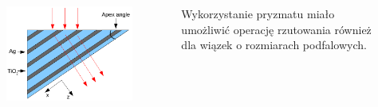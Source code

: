 \documentclass{beamer}
\begin{document}
\begin{frame}
\begin{columns}
\begin{column}{0.5\textwidth}
\begin{figure}
			\end{figure}
		\end{column}
	\end{columns}
		
\end{frame}


\begin{frame}
	\begin{columns}
		\begin{column}{0.5\textwidth}
			\begin{figure}
				\includegraphics[width=\textwidth]{../images/multilayer/prism.png}
			\end{figure}
		\end{column}
		\begin{column}{0.5\textwidth}
			Wykorzystanie pryzmatu miało umożliwić operację rzutowania również dla wiązek o rozmiarach podfalowych.
		\end{column}
	\end{columns}
		
\end{frame}
\end{document}
